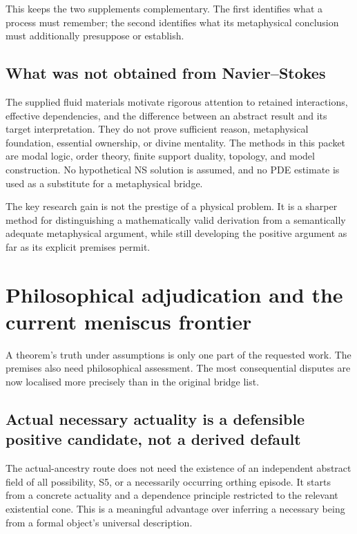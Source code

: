 \documentclass[11pt,a4paper]{article}
\begin{document}
This keeps the two supplements complementary. The first identifies what
a process must remember; the second identifies what its metaphysical
conclusion must additionally presuppose or establish.

\subsection{What was not obtained from
Navier--Stokes}\label{what-was-not-obtained-from-navierstokes}

The supplied fluid materials motivate rigorous attention to retained
interactions, effective dependencies, and the difference between an
abstract result and its target interpretation. They do not prove
sufficient reason, metaphysical foundation, essential ownership, or
divine mentality. The methods in this packet are modal logic, order
theory, finite support duality, topology, and model construction. No
hypothetical NS solution is assumed, and no PDE estimate is used as a
substitute for a metaphysical bridge.

The key research gain is not the prestige of a physical problem. It is a
sharper method for distinguishing a mathematically valid derivation from
a semantically adequate metaphysical argument, while still developing
the positive argument as far as its explicit premises permit.

\section{Philosophical adjudication and the current meniscus
frontier}\label{philosophical-adjudication-and-the-current-meniscus-frontier}

A theorem's truth under assumptions is only one part of the requested
work. The premises also need philosophical assessment. The most
consequential disputes are now localised more precisely than in the
original bridge list.

\subsection{Actual necessary actuality is a defensible positive
candidate, not a derived
default}\label{actual-necessary-actuality-is-a-defensible-positive-candidate-not-a-derived-default}

The actual-ancestry route does not need the existence of an independent
abstract field of all possibility, S5, or a necessarily occurring
orthing episode. It starts from a concrete actuality and a dependence
principle restricted to the relevant existential cone. This is a
meaningful advantage over inferring a necessary being from a formal
object's universal description.
\end{document}
